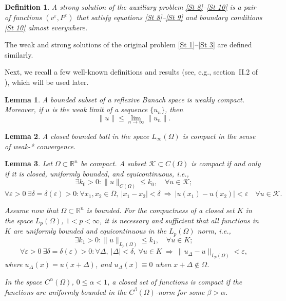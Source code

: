 \documentclass[11pt]{article}
\newtheorem{definition}{Definition}[section]
\newtheorem{lemma}{Lemma}
\begin{document}
\begin{definition}
	A strong solution of the auxiliary problem \eqref{St 8}--\eqref{St 10} is a pair of functions $(v^\varepsilon, P^\varepsilon)$ that satisfy equations \eqref{St 8}--\eqref{St 9} and boundary conditions \eqref{St 10} almost everywhere.
\end{definition}


The  weak and strong solutions of the original problem \eqref{St 1}--\eqref{St 3} are defined similarly.

Next, we recall a few well-known definitions and results (see, e.g., {section~II.2 of} \cite{antontsev1989boundary}), which will be used later.

\begin{lemma}\label{L1}
	A bounded subset of a reflexive Banach space is weakly compact. Moreover, if \( u \) is the weak limit of a sequence \( \{u_n\} \), then
	\[
	\|u\| \leq \lim\limits_{n \to \infty} \|u_n\|.
	\]
\end{lemma}

\begin{lemma}
	A closed bounded ball in the space $L_\infty(\Omega)$ is compact in the sense of weak-* convergence.
\end{lemma}

\begin{lemma}\label{L3}
	Let $\Omega\subset\mathbb{R}^n$ be compact. A subset \( \mathcal{K}\subset C(\Omega) \) is compact if and only if it is closed, uniformly bounded, and equicontinuous, i.e.,
	\[
	\exists k_0 > 0 : \|u\|_{C(\Omega)} \leq k_0, \quad \forall u \in \mathcal{K};
	\]
	\[
	\forall \varepsilon > 0 \ \exists \delta = \delta(\varepsilon) > 0 : \forall x_1, x_2 \in \overline{\Omega},\ |x_1 - x_2| < \delta \ \Rightarrow \ |u(x_1) - u(x_2)| < \varepsilon \quad \forall u \in \mathcal{K}.
	\]
	
	\noindent
	Assume now that $\Omega\subset\mathbb{R}^n$ is bounded. For the compactness of a closed set \( K \) in the space \( L_p(\Omega) \), \( 1 < p < \infty \), it is necessary and sufficient that all functions in \( K \) are uniformly bounded and equicontinuous in the \( L_p(\Omega) \) norm, i.e.,
	\[
	\exists k_1 > 0 : \|u\|_{L_p(\Omega)} \leq k_1,\quad \forall u \in K;
	\]
	\[
	\forall \varepsilon > 0\ \exists \delta = \delta(\varepsilon) > 0 : \forall \Delta,\ |\Delta| < \delta,\ \forall u \in K \ \Rightarrow \ \| u_\Delta - u \|_{L_p(\Omega)} < \varepsilon,
	\]
	where \( u_\Delta(x) = u(x + \Delta) \), and \( u_\Delta(x) \equiv 0 \) when \( x + \Delta \notin \Omega \).
	
	In the space $C^\alpha(\Omega)$, $ 0 \leq \alpha < 1$, a closed set of functions is compact if the functions are uniformly bounded in the $C^\beta(\Omega)$-norm for some $\beta > \alpha$.
\end{lemma}
\end{document}
